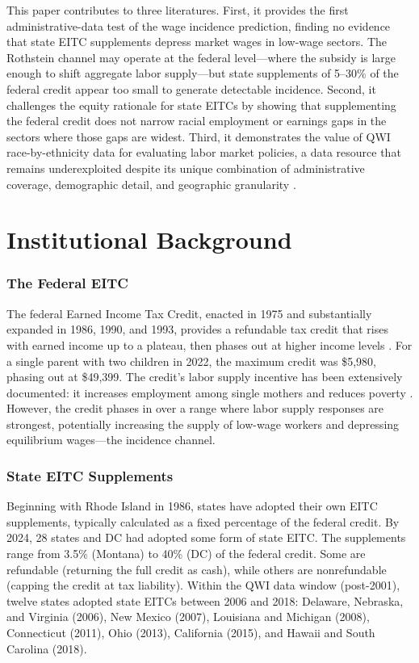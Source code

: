 \documentclass[12pt]{article}
\begin{document}
This paper contributes to three literatures. First, it provides the first administrative-data test of the \citet{rothstein2010} wage incidence prediction, finding no evidence that state EITC supplements depress market wages in low-wage sectors. The Rothstein channel may operate at the federal level---where the subsidy is large enough to shift aggregate labor supply---but state supplements of 5--30\% of the federal credit appear too small to generate detectable incidence. Second, it challenges the equity rationale for state EITCs by showing that supplementing the federal credit does not narrow racial employment or earnings gaps in the sectors where those gaps are widest. Third, it demonstrates the value of QWI race-by-ethnicity data for evaluating labor market policies, a data resource that remains underexploited despite its unique combination of administrative coverage, demographic detail, and geographic granularity \citep{abowd2009}.

\section{Institutional Background}

\subsubsection*{The Federal EITC} The federal Earned Income Tax Credit, enacted in 1975 and substantially expanded in 1986, 1990, and 1993, provides a refundable tax credit that rises with earned income up to a plateau, then phases out at higher income levels \citep{hotz2003}. For a single parent with two children in 2022, the maximum credit was \$5,980, phasing out at \$49,399. The credit's labor supply incentive has been extensively documented: it increases employment among single mothers \citep{eissa1996, meyer2001} and reduces poverty \citep{hoynes2018}. However, the credit phases in over a range where labor supply responses are strongest, potentially increasing the supply of low-wage workers and depressing equilibrium wages---the \citet{rothstein2010} incidence channel.

\subsubsection*{State EITC Supplements} Beginning with Rhode Island in 1986, states have adopted their own EITC supplements, typically calculated as a fixed percentage of the federal credit. By 2024, 28 states and DC had adopted some form of state EITC. The supplements range from 3.5\% (Montana) to 40\% (DC) of the federal credit. Some are refundable (returning the full credit as cash), while others are nonrefundable (capping the credit at tax liability). Within the QWI data window (post-2001), twelve states adopted state EITCs between 2006 and 2018: Delaware, Nebraska, and Virginia (2006), New Mexico (2007), Louisiana and Michigan (2008), Connecticut (2011), Ohio (2013), California (2015), and Hawaii and South Carolina (2018).
\end{document}
